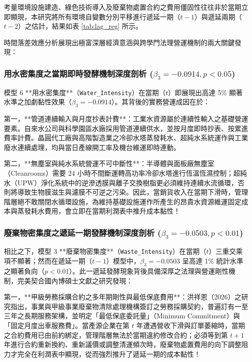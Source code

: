 \documentclass[12pt,a4paper]{article}
\begin{document}
考量環境設施建造、綠色技術導入及廢棄物處置合約之費用僵固性往往非於當期立即顯現，本研究將所有環境自變數分別平移進行遞延一期（$t-1$）與遞延兩期（$t-2$）之估計，結果如表 \ref{tab:lag_reg} 所示。

時間落差效應分析展現出極富深層經濟意涵與跨學門法理營運機制的兩大關鍵發現：

\subsubsection{用水密集度之當期即時發酵機制深度剖析 \texorpdfstring{($\beta_3 = -0.0914, p < 0.05$)}{(beta3 = -0.0914, p < 0.05)}}

模型 6 **用水密集度**（\texttt{Water\_Intensity}）在當期（$t$）即展現出高達 5\% 顯著水準之加劇黏性效果（$\beta_3 = -0.0914$）。其背後的實務營運成因在於：

第一，**管道連續輸入與月度抄表計費**：工業水資源屬於連續性輸入之基礎營運要素。自來水公司與科學園區水廠採用管道連續供水，並按月度即時抄表、按累進費率計費。晶圓代工廠與高階製造業之冷卻水塔蒸發耗水、超純水系統運作與工業廢水連續處理，均與當日產線開工率及機台維運即時連動。

第二，**無塵室與純水系統營運不可中斷性**：半導體與面板廠無塵室（Cleanrooms）需要 24 小時不間斷運轉高功率冷卻水塔進行恆溫恆濕控制；超純水（UPW）淨化系統中的逆滲透膜與離子交換樹脂更必須維持連續水流循環，否則將導致生物膜滋生與濾膜不可逆之污染。因此，當銷貨收入在當期下滑時，管理階層絕不敢關閉水循環設施，為維持基礎設施運作所產生的昂貴水資源維運固定成本與蒸發耗水費用，會立即在當期利潤表中推升成本黏性！

\subsubsection{廢棄物密集度之遞延一期發酵機制深度剖析 \texorpdfstring{($\beta_3 = -0.0503, p < 0.01$)}{(beta3 = -0.0503, p < 0.01)}}

相比之下，模型 3 **廢棄物密集度**（\texttt{Waste\_Intensity}）在當期（$t$）三重交乘項不顯著；然而在遞延一期（$t-1$）模型中，$\beta_3 = -0.0503$ 呈高達 1\% 統計水準之顯著負向（$p < 0.01$）。此一遞延發酵現象背後具備深厚之法理與營運剛性機制，完美契合國內博碩士文獻之研究發現：

第一，**甲級勞務採購合約之多年期剛性與最低保底費用**：洪祥恩（2026）之研究指出，事業與甲級事業廢棄物清除處理機構簽訂之勞務採購契約，普遍訂有一至三年之長期服務架構，並明定「最低保底委託量」（Minimum Commitment）與「固定月度出車服務費」。當產源企業在第 $t$ 年遭遇營收下滑與訂單萎縮時，當期之合約費用已由前約綁定，管理階層無法於當期違約修改合約；必須等到第 $t+1$ 年進行合約重新換約、重新議價或調整清運頻次時，廢棄物處置費用的向下調整阻力才完全在利潤表中顯現，從而強烈推升了遞延一期的成本黏性！
\end{document}
